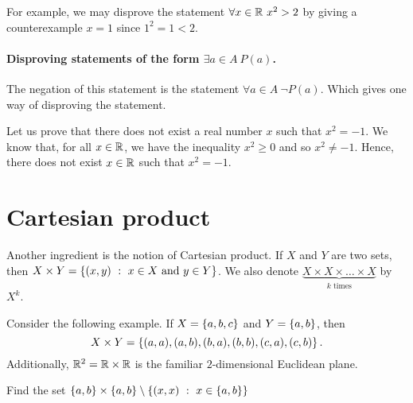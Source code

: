 For example, we may disprove the statement $\forall x \in \mathbb{R} \ x^2 > 2$ by
giving a counterexample $x = 1$ since $1^2 = 1 < 2$.

\paragraph{Disproving statements of the form $\exists a \in A \ P(a)$.}
The negation of this statement is the statement $\forall a \in A \ \lnot P(a)$.
Which gives one way of disproving the statement.

Let us prove that there does not exist a real number $x$ such that $x^2 = -1$.
We know that, for all $x \in \mathbb{R}$, we have the inequality $x^2 \ge 0$ and so $x^2
\neq -1$. Hence, there does not exist $x \in \mathbb{R}$ such that $x^2 = -1$.

\section{Cartesian product}
Another ingredient is the notion of Cartesian product. If $X$ and $Y$ are two
sets, then $X \times Y = \set[x \in X \text{ and } y \in Y]{(x, y)}$. We also
denote $\underbrace{X \times X \times \dots \times X}_{k \text{ times}}$ by
$X^k$.

Consider the following example. If $X = \set{a, b, c}$ and $Y = \set{a, b}$,
then
\[
  X \times Y = \set{(a, a), (a, b), (b, a), (b, b), (c, a), (c, b)}.
\]
Additionally, $\mathbb{R}^2 = \mathbb{R} \times \mathbb{R}$ is the familiar $2$-dimensional Euclidean
plane.

\begin{exercise}
  Find the set $\set{a, b} \times \set{a, b} \setminus
  \set[x \in \set{a, b}]{(x, x)}$
\end{exercise}

